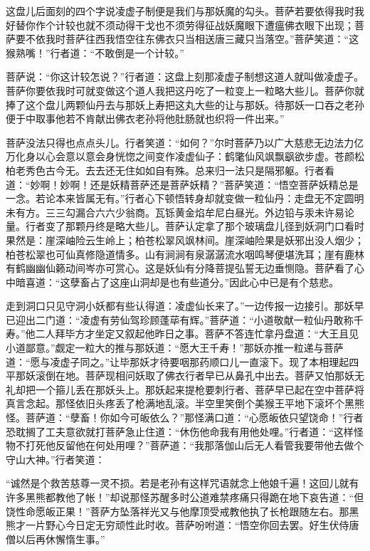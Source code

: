 \documentclass[12pt,UTF8]{ctexbook}
\begin{document}
{这盘儿后面刻的四个字说凌虚子制便是我们与那妖魔的勾头。菩萨若要依得我时我好替你作个计较也就不须动得干戈也不须劳得征战妖魔眼下遭瘟佛衣眼下出现；菩萨要不依我时菩萨往西我悟空往东佛衣只当相送唐三藏只当落空。”菩萨笑道：“这猴熟嘴！”行者道：“不敢倒是一个计较。”

菩萨说：“你这计较怎说？”行者道：这盘上刻那凌虚子制想这道人就叫做凌虚子。菩萨你要依我时可就变做这个道人我把这丹吃了一粒变上一粒略大些儿。菩萨你就捧了这个盘儿两颗仙丹去与那妖上寿把这丸大些的让与那妖。待那妖一口吞之老孙便于中取事他若不肯献出佛衣老孙将他肚肠就也织将一件出来。”

菩萨没法只得也点点头儿。行者笑道：“如何？”尔时菩萨乃以广大慈悲无边法力亿万化身以心会意以意会身恍惚之间变作凌虚仙子：鹤氅仙风飒飘飖欲步虚。苍颜松柏老秀色古今无。去去还无住如如自有殊。总来归一法只是隔邪躯。行者看道：“妙啊！妙啊！还是妖精菩萨还是菩萨妖精？”菩萨笑道：“悟空菩萨妖精总是一念。若论本来皆属无有。”行者心下顿悟转身却就变做一粒仙丹：走盘无不定圆明未有方。三三勾漏合六六少翁商。瓦铄黄金焰牟尼白昼光。外边铅与汞未许易论量。行者变了那颗丹终是略大些儿。菩萨认定拿了那个玻璃盘儿径到妖洞门口看时果然是：崖深岫险云生岭上；柏苍松翠风飒林间。崖深岫险果是妖邪出没人烟少；柏苍松翠也可仙真修隐道情多。山有涧涧有泉潺潺流水咽鸣琴便堪洗耳；崖有鹿林有鹤幽幽仙籁动间岑亦可赏心。这是妖仙有分降菩提弘誓无边垂恻隐。菩萨看了心中暗喜道：“这孽畜占了这座山洞却是也有些道分。”因此心中已是有个慈悲。

走到洞口只见守洞小妖都有些认得道：凌虚仙长来了。”一边传报一边接引。那妖早已迎出二门道：“凌虚有劳仙驾珍顾蓬荜有辉。”菩萨道：“小道敬献一粒仙丹敢称千寿。”他二人拜毕方才坐定又叙起他昨日之事。菩萨不答连忙拿丹盘道：“大王且见小道鄙意。”觑定一粒大的推与那妖道：“愿大王千寿！”那妖亦推一粒递与菩萨道：“愿与凌虚子同之。”让毕那妖才待要咽那药顺口儿一直滚下。现了本相理起四平那妖滚倒在地。菩萨现相问妖取了佛衣行者早已从鼻孔中出去。菩萨又怕那妖无礼却把一个箍儿丢在那妖头上。那妖起来提枪要刺行者、菩萨早已起在空中菩萨将真言念起。那怪依旧头疼丢了枪满地乱滚。半空里笑倒个美猴王平地下滚坏个黑熊怪。菩萨道：“孽畜！你如今可皈依么？”那怪满口道：“心愿皈依只望饶命！”行者恐耽搁了工夫意欲就打菩萨急止住道：“休伤他命我有用他处哩。”行者道：“这样怪物不打死他反留他在何处用哩？”菩萨道：“我那落伽山后无人看管我要带他去做个守山大神。”行者笑道：

“诚然是个救苦慈尊一灵不损。若是老孙有这样咒语就念上他娘千遍！这回儿就有许多黑熊都教他了帐！”却说那怪苏醒多时公道难禁疼痛只得跪在地下哀告道：“但饶性命愿皈正果！”菩萨方坠落祥光又与他摩顶受戒教他执了长枪跟随左右。那黑熊才一片野心今日定无穷顽性此时收。菩萨吩咐道：“悟空你回去罢。好生伏侍唐僧以后再休懈惰生事。”

}
\end{document}
